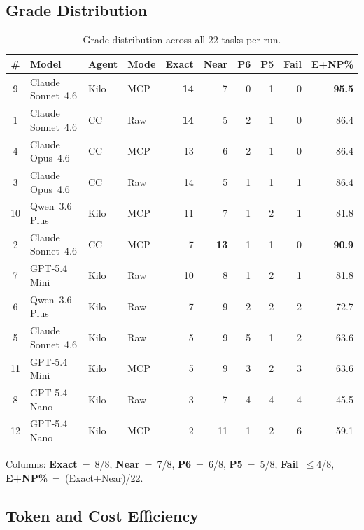 \subsection{Grade Distribution}

\begin{table}[h]
\centering
\small
\caption{Grade distribution across all 22 tasks per run.}\label{tab:grades}
\setlength{\tabcolsep}{4.5pt}
\begin{tabular}{clllrrrrrr}
\toprule
\textbf{\#} & \textbf{Model} & \textbf{Agent} & \textbf{Mode}
  & \textbf{Exact} & \textbf{Near} & \textbf{P6} & \textbf{P5} & \textbf{Fail}
  & \textbf{E+NP\%} \\
\midrule
\rowcolor{bestcol}
 9 & Claude Sonnet~4.6 & Kilo & MCP & \textbf{14} & 7 & 0 & 1 & 0 & \textbf{95.5} \\
 1 & Claude Sonnet~4.6 & CC   & Raw & \textbf{14} & 5 & 2 & 1 & 0 & 86.4 \\
 4 & Claude Opus~4.6   & CC   & MCP & 13 & 6 & 2 & 1 & 0 & 86.4 \\
 3 & Claude Opus~4.6   & CC   & Raw & 14 & 5 & 1 & 1 & 1 & 86.4 \\
10 & Qwen~3.6 Plus     & Kilo & MCP & 11 & 7 & 1 & 2 & 1 & 81.8 \\
 2 & Claude Sonnet~4.6 & CC   & MCP &  7 & \textbf{13} & 1 & 1 & 0 & \textbf{90.9} \\
 7 & GPT-5.4 Mini      & Kilo & Raw & 10 & 8 & 1 & 2 & 1 & 81.8 \\
 6 & Qwen~3.6 Plus     & Kilo & Raw &  7 & 9 & 2 & 2 & 2 & 72.7 \\
 5 & Claude Sonnet~4.6 & Kilo & Raw &  5 & 9 & 5 & 1 & 2 & 63.6 \\
11 & GPT-5.4 Mini      & Kilo & MCP &  5 & 9 & 3 & 2 & 3 & 63.6 \\
 8 & GPT-5.4 Nano      & Kilo & Raw &  3 & 7 & 4 & 4 & 4 & 45.5 \\
12 & GPT-5.4 Nano      & Kilo & MCP &  2 & 11 & 1 & 2 & 6 & 59.1 \\
\bottomrule
\end{tabular}
\end{table}

\noindent
Columns: \textbf{Exact}~=~8/8, \textbf{Near}~=~7/8,
\textbf{P6}~=~6/8, \textbf{P5}~=~5/8, \textbf{Fail}~$\le$4/8,
\textbf{E+NP\%}~=~(Exact+Near)/22.

\subsection{Token and Cost Efficiency}

